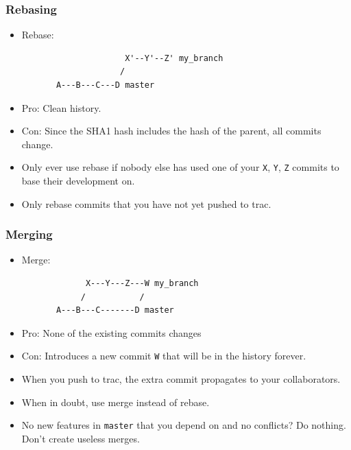 \begin{frame}[fragile]
  \frametitle{Rebasing}
  
    \begin{itemize}
    \item Rebase: 
\begin{verbatim}
                     X'--Y'--Z' my_branch
                    /
       A---B---C---D master
\end{verbatim}
    \item Pro: Clean history.
    \item Con: Since the SHA1 hash includes the hash of the parent,
      all commits change.
    \item Only ever use rebase if nobody else has used one of your
      \texttt{X}, \texttt{Y}, \texttt{Z} commits to base their
      development on.
    \item Only rebase commits that you have not yet pushed to trac.
  \end{itemize}
  
\end{frame}





\begin{frame}[fragile]
  \frametitle{Merging}
  
    \begin{itemize}
  \item Merge: 
\begin{verbatim}
             X---Y---Z---W my_branch
            /           /
       A---B---C-------D master
\end{verbatim}
      \item Pro: None of the existing commits changes
      \item Con: Introduces a new commit \texttt{W} that will be in the
         history forever.
      \item When you push to trac, the extra commit propagates to your
        collaborators. 
      \item When in doubt, use merge instead of rebase.
      \item No new features in \texttt{master} that you depend on and
        no conflicts? Do nothing. Don't create useless merges.
  \end{itemize}
  
\end{frame}



